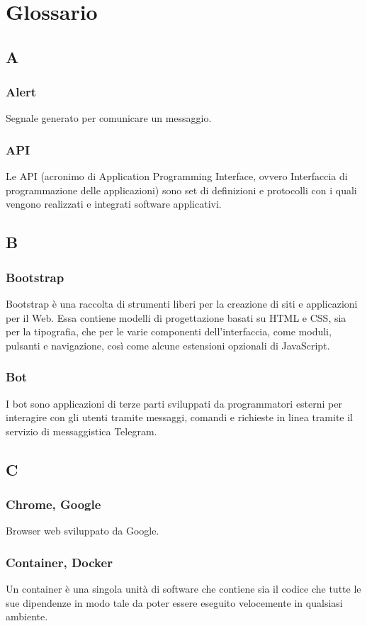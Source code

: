 \appendix
{}

\section{Glossario}
\subsection{A}
\subsubsection*{Alert} Segnale generato per comunicare un messaggio.
\subsubsection*{API} Le API (acronimo di Application Programming Interface, ovvero Interfaccia di programmazione delle applicazioni) sono set di definizioni e protocolli con i quali vengono realizzati e integrati software applicativi.
\subsection{B}
\subsubsection*{Bootstrap}  Bootstrap è una raccolta di strumenti liberi per la creazione di siti e applicazioni per il Web. Essa contiene modelli di progettazione basati su HTML e CSS, sia per la tipografia, che per le varie componenti dell'interfaccia, come moduli, pulsanti e navigazione, così come alcune estensioni opzionali di JavaScript.
\subsubsection*{Bot}  I bot sono applicazioni di terze parti sviluppati da programmatori esterni per interagire con gli utenti tramite messaggi, comandi e richieste in linea tramite il servizio di messaggistica Telegram.
\subsection{C}
\subsubsection*{Chrome, Google}
Browser web sviluppato da Google.
\subsubsection*{Container, Docker}
Un container è una singola unità di software che contiene sia il codice che tutte le sue dipendenze in modo tale da poter essere eseguito velocemente in qualsiasi ambiente.
